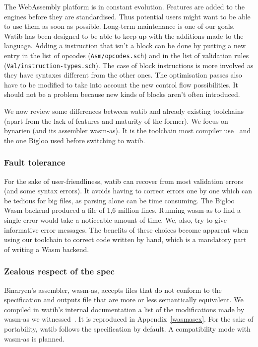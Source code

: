 \documentclass[a4paper,11pt]{article}
\begin{document}
The WebAssembly platform is in constant evolution. Features are added to the
engines before they are standardised. Thus potential users might want to be able
to use them as soon as possible. Long-term maintenance is one of our goals.
\textsf{Watib} has been designed to be able to keep up with the additions made
to the language. Adding a instruction that isn't a block can be done by putting
a new entry in the list of opcodes (\texttt{Asm/opcodes.sch}) and in the list of
validation rules (\texttt{Val/instruction-types.sch}). The case of block
instructions is more involved as they have syntaxes different from the other
ones. The optimisation passes also have to be modified to take into account the
new control flow possibilities. It should not be a problem because new kinds of
blocks aren't often introduced.

We now review some differences between \textsf{watib} and already existing
toolchains (apart from the lack of features and maturity of the former). We
focus on bynarien (and its assembler \textsf{wasm-as}). It is the toolchain most
compiler use~\cite{Binaryen} and the one Bigloo used before switching to
\textsf{watib}.
\subsubsection{Fault tolerance}
For the sake of user-friendliness, \textsf{watib} can recover from most
validation errors (and some syntax errors). It avoids having to correct errors
one by one which can be tedious for big files, as parsing alone can be time
consuming. The Bigloo Wasm backend produced a file of 1,6 million lines. Running
\textsf{wasm-as} to find a single error would take a noticeable amount of time.
We, also, try to give informative error messages. The benefits of these choices
become apparent when using our toolchain to correct code written by hand, which
is a mandatory part of writing a Wasm backend.

\subsubsection{{Zealous\protect\footnotemark} respect of the spec}
Binaryen's assembler, \textsf{wasm-as}, accepts files that do not conform to the
specification and outputs file that are more or less semantically equivalent. We
compiled in \textsf{watib}'s internal documentation a list of the modifications
made by \textsf{wasm-as} we witnessed~\cite{WasmAsExtension}. It is reproduced
in Appendix~\ref{wasmasex}. For the sake of portability, watib follows the
specification by default. A compatibility mode with \textsf{wasm-as} is
planned.
\end{document}
